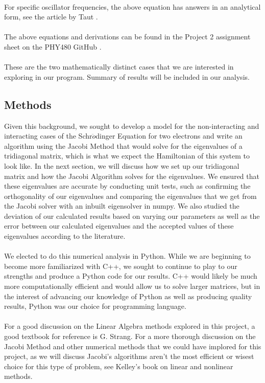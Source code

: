 \documentclass{article}
\begin{document}
\\
For specific oscillator frequencies, the above equation has answers in an analytical form, see the article by Taut \cite{journal}.\\
\\
The above equations and derivations can be found in the Project 2 assignment sheet on the PHY480 GitHub \cite{mortengithub}.\\
\\
These are the two mathematically distinct cases that we are interested in exploring in our program. Summary of results will be included in our analysis.

\subsection{Methods}
Given this background, we sought to develop a model for the non-interacting and interacting cases of the Schr$\ddot{o}$dinger Equation for two electrons and write an algorithm using the Jacobi Method that would solve for the eigenvalues of a tridiagonal matrix, which is what we expect the Hamiltonian of this system to look like. In the next section, we will discuss how we set up our tridiagonal matrix and how the Jacobi Algorithm solves for the eigenvalues. We ensured that these eigenvalues are accurate by conducting unit tests, such as confirming the orthogonality of our eigenvalues and comparing the eigenvalues that we get from the Jacobi solver with an inbuilt eigensolver in numpy. We also studied the deviation of our calculated results based on varying our parameters as well as the error between our calculated eigenvalues and the accepted values of these eigenvalues according to the literature.\cite{journal}\\
\\
We elected to do this numerical analysis in Python. While we are beginning to become more familiarized with C++, we sought to continue to play to our strengths and produce a Python code for our results. C++ would likely be much more computationally efficient and would allow us to solve larger matrices, but in the interest of advancing our knowledge of Python as well as producing quality results, Python was our choice for programming language.\\
\\
For a good discussion on the Linear Algebra methods explored in this project, a good textbook for reference is G. Strang. \cite{textbook} For a more thorough discussion on the Jacobi Method and other numerical methods that we could have implored for this project, as we will discuss Jacobi's algorithms aren't the most efficient or wisest choice for this type of problem, see Kelley's book on linear and nonlinear methods. \cite{kelley}
\end{document}
